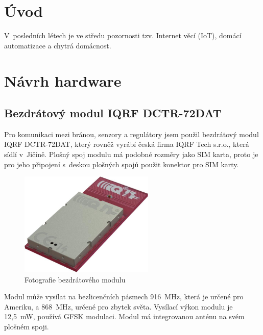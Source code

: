 \documentclass[12pt,a4paper]{article}
\begin{document}
\newpage

\tableofcontents

\newpage

\pagestyle{plain}

\section*{Úvod}


V~posledních létech je ve středu pozornosti tzv. Internet věcí (IoT), domácí automatizace a chytrá domácnost.

\newpage

\section{Návrh hardware}

\subsection{Bezdrátový modul IQRF DCTR-72DAT}

Pro komunikaci mezi bránou, senzory a regulátory jsem použil bezdrátový modul IQRF DCTR-72DAT, který rovněž vyrábí česká firma IQRF Tech s.r.o., která sídlí v~Jičíně. Plošný spoj modulu má podobné rozměry jako SIM karta, proto je pro jeho připojení s~deskou plošných spojů použit konektor pro SIM karty. \\

\begin{figure}[H]
\centering
\label{fig:iqrf/fotka}
\includegraphics[width = 64mm]{img/iqrf/dctr-72dat.png}
\caption{Fotografie bezdrátového modulu}
\end{figure}

Modul může vysílat na bezlicenčních pásmech 916~MHz, která je určené pro Ameriku, a 868~MHz, určené pro zbytek světa. Vysílací výkon modulu je 12,5~mW, používá GFSK modulaci. Modul má integrovanou anténu na svém plošném spoji. \\
\end{document}
